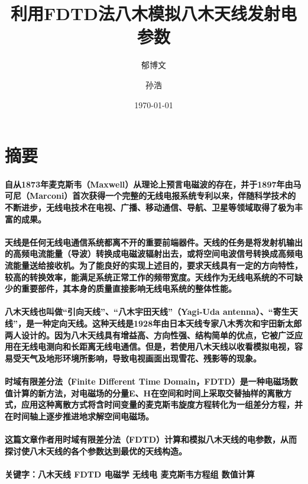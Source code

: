 \documentclass[UTF8]{ctexart}
\title{利用FDTD法八木模拟八木天线发射电参数}
\author{郁博文 \and 孙浩}
\date{\today}
\begin{document}
\maketitle
\newpage
\tableofcontents
\newpage
\section{摘要}
\paragraph{自从1873年麦克斯韦（Maxwell）从理论上预言电磁波的存在，并于1897年由马可尼（Marconi）首次获得一个完整的无线电报系统专利以来，伴随科学技术的不断进步，无线电技术在电视、广播、移动通信、导航、卫星等领域取得了极为丰富的成果。}
\paragraph{天线是任何无线电通信系统都离不开的重要前端器件。天线的任务是将发射机输出的高频电流能量（导波）转换成电磁波辐射出去，或将空间电波信号转换成高频电流能量送给接收机。为了能良好的实现上述目的，要求天线具有一定的方向特性，较高的转换效率，能满足系统正常工作的频带宽度。天线作为无线电系统的不可缺少的重要部件，其本身的质量直接影响无线电系统的整体性能。}
\paragraph{八木天线也叫做“引向天线”、“八木宇田天线”（Yagi-Uda antenna）、“寄生天线”，是一种定向天线。这种天线是1928年由日本天线专家八木秀次和宇田新太郎两人设计的。因为八木天线具有增益高、方向性强、结构简单的优点，它被广泛应用在无线电测向和长距离无线电通信。但是，若使用八木天线以收看模拟电视，容易受天气及地形环境所影响，导致电视画面出现雪花、残影等的现象。}
\paragraph{时域有限差分法（Finite Different Time Domain，FDTD）是一种电磁场数值计算的新方法，对电磁场的分量E、H在空间和时间上采取交替抽样的离散方式，应用这种离散方式将含时间变量的麦克斯韦旋度方程转化为一组差分方程，并在时间轴上逐步推进地求解空间电磁场。}
\paragraph{这篇文章作者用时域有限差分法（FDTD）计算和模拟八木天线的电参数，从而探讨使八木天线的各个参数达到最优的天线构造。}
\paragraph{关键字：八木天线 FDTD 电磁学 无线电 麦克斯韦方程组 数值计算}
\newpage
\end{document}
